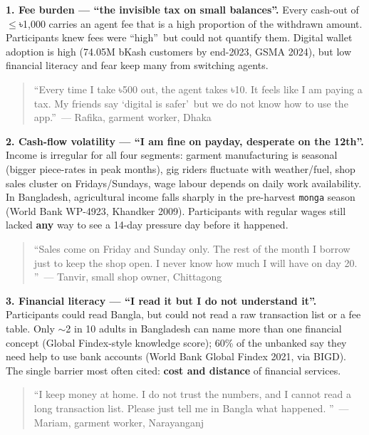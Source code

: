 \documentclass[11pt, a4paper]{article}
\begin{document}
\textbf{1. Fee burden --- \textquotedblleft the invisible tax on small
balances\textquotedblright.} Every cash-out of $\leq$৳1,000 carries an agent fee
that is a high proportion of the withdrawn amount. Participants knew fees were
\textquotedblleft high\textquotedblright\ but could not quantify them. Digital
wallet adoption is high (74.05M bKash customers by end-2023, GSMA 2024), but low
financial literacy and fear keep many from switching agents.

\begin{quote}
\textquotedblleft Every time I take ৳500 out, the agent takes ৳10. It feels like
I am paying a tax. My friends say \textquoteleft digital is safer\textquoteright\ but
we do not know how to use the app.\textquotedblright\ --- Rafika, garment worker,
Dhaka
\end{quote}

\textbf{2. Cash-flow volatility --- \textquotedblleft I am fine on payday, desperate
on the 12th\textquotedblright.} Income is irregular for all four segments:
garment manufacturing is seasonal (bigger piece-rates in peak months), gig riders
fluctuate with weather/fuel, shop sales cluster on Fridays/Sundays, wage labour
depends on daily work availability. In Bangladesh, agricultural income falls
sharply in the pre-harvest \texttt{monga} season (World Bank WP-4923, Khandker
2009). Participants with regular wages still lacked \textbf{any} way to see a
14-day pressure day before it happened.

\begin{quote}
\textquotedblleft Sales come on Friday and Sunday only. The rest of the month I
borrow just to keep the shop open. I never know how much I will have on day 20.
\textquotedblright\ --- Tanvir, small shop owner, Chittagong
\end{quote}

\textbf{3. Financial literacy --- \textquotedblleft I read it but I do not
understand it\textquotedblright.} Participants could read Bangla, but could not
read a raw transaction list or a fee table. Only $\sim$2 in 10 adults in
Bangladesh can name more than one financial concept (Global Findex-style
knowledge score); 60\% of the unbanked say they need help to use bank accounts
(World Bank Global Findex 2021, via BIGD). The single barrier most often cited:
\textbf{cost and distance} of financial services.

\begin{quote}
\textquotedblleft I keep money at home. I do not trust the numbers, and I cannot
read a long transaction list. Please just tell me in Bangla what happened.
\textquotedblright\ --- Mariam, garment worker, Narayanganj
\end{quote}
\end{document}
